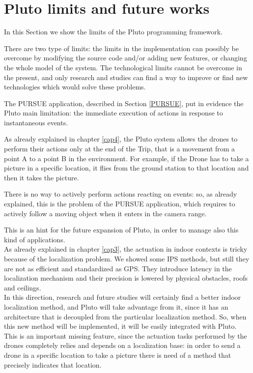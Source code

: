 \section{Pluto limits and future works}

In this Section we show the limits of the Pluto programming framework.

There are two type of limits:
the limits in the implementation can possibly be overcome by modifying the source code and/or adding new features, or changing the whole model of the system.
The technological limits cannot be overcome in the present, and only research and studies can find a way to improve or find new technologies which would solve these problems.


The PURSUE application, described in Section \ref{PURSUE}, put in evidence the Pluto main limitation: the immediate execution of actions in response to instantaneous events.

As already explained in chapter \ref{cap4}, the Pluto system allows the drones to perform their actions only at the end of the Trip, that is a movement from a point A to a point B in the environment.
For example, if the Drone has to take a picture in a specific location, it flies from the ground station to that location and then it takes the picture.

There is no way to actively perform actions reacting on events:
so, as already explained, this is the problem of the PURSUE application, which requires to actively follow a moving object when it enters in the camera range.

This is an hint for the future expansion of Pluto, in order to manage also this kind of applications.
\\

As already explained in chapter \ref{cap3}, the actuation in indoor contexts is tricky because of the localization problem.
We showed some IPS methods, but still they are not as efficient and standardized as GPS.
They introduce latency in the localization mechanism and their precision is lowered by physical obstacles, roofs and ceilings.
\\

In this direction, research and future studies will certainly find a better indoor localization method, and Pluto will take advantage from it, since it has an architecture that is decoupled from the particular localization method.
So, when this new method will be implemented, it will be easily integrated with Pluto.
This is an important missing feature, since the actuation tasks performed by the drones completely relies and depends on a localization base:
in order to send a drone in a specific location to take a picture there is need of a method that precisely indicates that location.
\\

